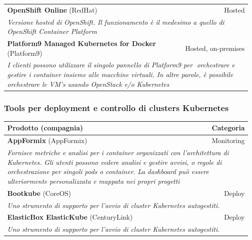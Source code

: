 \documentclass[12pt, a4paper]{report}
\begin{document}
\begin{table}[ht]
  \small
  \begin{center}
  \begin{tabularx}{\textwidth}{|lr|}
  \hline
  \textbf{OpenShift Online} (RedHat)&Hosted\\
  \multicolumn{2}{|X|}{\textit{Versione hosted di OpenShift. Il funzionamento è il medesimo a quello di OpenShift Container Platform}}\\
  \hline
  \textbf{Platform9 Managed Kubernetes for Docker} (Platform9)&Hosted, on-premises\\
  \multicolumn{2}{|X|}{\textit{I clienti possono utilizzare il singolo pannello di Platform9 per 􏰅orchestrare e gestire i container insieme alle macchine virtuali. In altre parole, è possibile orchestrare le VM's usando OpenStack e/o Kubernetes}}\\
  \hline
  \end{tabularx}
  \end{center}
\end{table}
\subsubsection{Tools per deployment e controllo di clusters Kubernetes}
\begin{table}[ht]
\small
\begin{center}
\begin{tabularx}{\textwidth}{|lr|}
\hline
\textbf{Prodotto} (compagnia) & \textbf{Categoria}\\
\hline
\textbf{AppFormix} (AppFormix)&Monitoring\\
\multicolumn{2}{|X|}{\textit{Fornisce metriche e analisi per i container organizzati con l'architettura di Kubernetes. Gli utenti possono vedere analisi e gestire avvisi, o regole di orchestrazione per singoli pods o container. La dashboard può essere ulteriormente personalizzata e mappata nei propri progetti}}\\
\hline
\textbf{Bootkube} (CoreOS)&Deploy\\
\multicolumn{2}{|X|}{\textit{Uno strumento di supporto per l'avvio di cluster Kubernetes autogestiti.}}\\
\hline
\textbf{ElasticBox ElasticKube} (CenturyLink)&Deploy\\
\multicolumn{2}{|X|}{\textit{Uno strumento di supporto per l'avvio di cluster Kubernetes autogestiti.}}\\
\hline
\end{tabularx}
\end{center}
\end{table}
\end{document}
